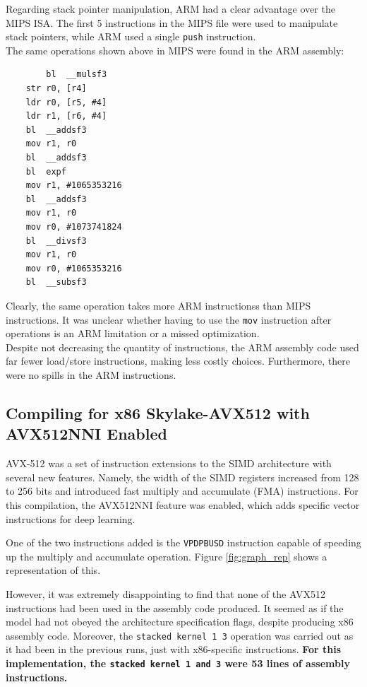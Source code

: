 \documentclass[twocolumn]{article}
\newcommand{\cc}[1]{\texttt{#1}}
\begin{document}
Regarding stack pointer manipulation, ARM had a clear advantage over the MIPS ISA. The first 5 instructions in the MIPS file were used to manipulate stack pointers, while ARM used a single \cc{push} instruction. \\

The same operations shown above in MIPS were found in the ARM assembly: 
\begin{lstlisting}
        bl	__mulsf3
	str	r0, [r4]
	ldr	r0, [r5, #4]
	ldr	r1, [r6, #4]
	bl	__addsf3
	mov	r1, r0
	bl	__addsf3
	bl	expf
	mov	r1, #1065353216
	bl	__addsf3
	mov	r1, r0
	mov	r0, #1073741824
	bl	__divsf3
	mov	r1, r0
	mov	r0, #1065353216
	bl	__subsf3
\end{lstlisting}

Clearly, the same operation takes more ARM instructionss than MIPS instructions. It was unclear whether having to use the \cc{mov} instruction after operations is an ARM limitation or a missed optimization. \\

Despite not decreasing the quantity of instructions, the ARM assembly code used far fewer load/store instructions, making less costly choices. Furthermore, there were no spills in the ARM instructions.

\subsection{Compiling for x86 Skylake-AVX512 with AVX512NNI Enabled}

AVX-512 was a set of instruction extensions to the SIMD architecture with several new features. Namely, the width of the SIMD registers increased from 128 to 256 bits and introduced fast multiply and accumulate (FMA) instructions. For this compilation, the AVX512NNI feature was enabled, which adds specific vector instructions for deep learning. 

One of the two instructions added is the \cc{VPDPBUSD} instruction capable of speeding up the multiply and accumulate operation. Figure \ref{fig:graph_rep} shows a representation of this. 

However, it was extremely disappointing to find that none of the AVX512 instructions had been used in the assembly code produced. It seemed as if the model had not obeyed the architecture specification flags, despite producing x86 assembly code. Moreover, the \cc{stacked kernel 1 3} operation was carried out as it had been in the previous runs, just with x86-specific instructions. \textbf{For this implementation,  the \cc{stacked kernel 1 and 3} were 53 lines of assembly instructions.} 
\end{document}

